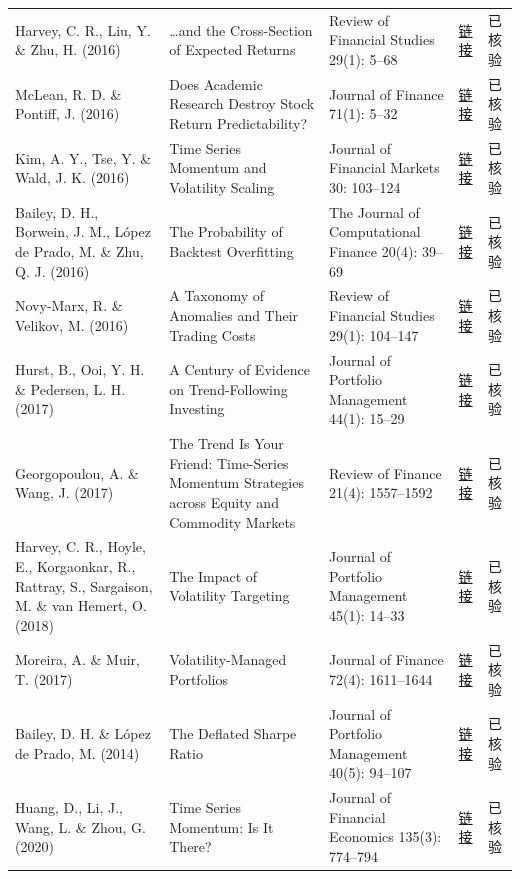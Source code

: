 \begin{longtable}{@{}>{\raggedright\arraybackslash}p{2.55cm}>{\raggedright\arraybackslash}p{4.7cm}>{\raggedright\arraybackslash}p{2.7cm}>{\raggedright\arraybackslash}p{1.9cm}>{\raggedright\arraybackslash}p{1.45cm}@{}}
Harvey, C. R., Liu, Y. \& Zhu, H. (2016) & …and the Cross-Section of Expected Returns & Review of Financial Studies 29(1): 5--68 & \href{https://doi.org/10.1093/rfs/hhv059}{链接} & 已核验 \\
McLean, R. D. \& Pontiff, J. (2016) & Does Academic Research Destroy Stock Return Predictability? & Journal of Finance 71(1): 5--32 & \href{https://doi.org/10.1111/jofi.12365}{链接} & 已核验 \\
Kim, A. Y., Tse, Y. \& Wald, J. K. (2016) & Time Series Momentum and Volatility Scaling & Journal of Financial Markets 30: 103--124 & \href{https://doi.org/10.1016/j.finmar.2016.05.003}{链接} & 已核验 \\
Bailey, D. H., Borwein, J. M., López de Prado, M. \& Zhu, Q. J. (2016) & The Probability of Backtest Overfitting & The Journal of Computational Finance 20(4): 39--69 & \href{https://doi.org/10.21314/jcf.2016.322}{链接} & 已核验 \\
Novy-Marx, R. \& Velikov, M. (2016) & A Taxonomy of Anomalies and Their Trading Costs & Review of Financial Studies 29(1): 104--147 & \href{https://doi.org/10.1093/rfs/hhv063}{链接} & 已核验 \\
Hurst, B., Ooi, Y. H. \& Pedersen, L. H. (2017) & A Century of Evidence on Trend-Following Investing & Journal of Portfolio Management 44(1): 15--29 & \href{https://doi.org/10.3905/jpm.2017.44.1.015}{链接} & 已核验 \\
Georgopoulou, A. \& Wang, J. (2017) & The Trend Is Your Friend: Time-Series Momentum Strategies across Equity and Commodity Markets & Review of Finance 21(4): 1557--1592 & \href{https://doi.org/10.1093/rof/rfw048}{链接} & 已核验 \\
Harvey, C. R., Hoyle, E., Korgaonkar, R., Rattray, S., Sargaison, M. \& van Hemert, O. (2018) & The Impact of Volatility Targeting & Journal of Portfolio Management 45(1): 14--33 & \href{https://doi.org/10.3905/jpm.2018.45.1.014}{链接} & 已核验 \\
Moreira, A. \& Muir, T. (2017) & Volatility-Managed Portfolios & Journal of Finance 72(4): 1611--1644 & \href{https://doi.org/10.1111/jofi.12513}{链接} & 已核验 \\
Bailey, D. H. \& López de Prado, M. (2014) & The Deflated Sharpe Ratio & Journal of Portfolio Management 40(5): 94--107 & \href{https://doi.org/10.3905/jpm.2014.40.5.094}{链接} & 已核验 \\
Huang, D., Li, J., Wang, L. \& Zhou, G. (2020) & Time Series Momentum: Is It There? & Journal of Financial Economics 135(3): 774--794 & \href{https://doi.org/10.1016/j.jfineco.2019.08.004}{链接} & 已核验 \\

\end{longtable}
